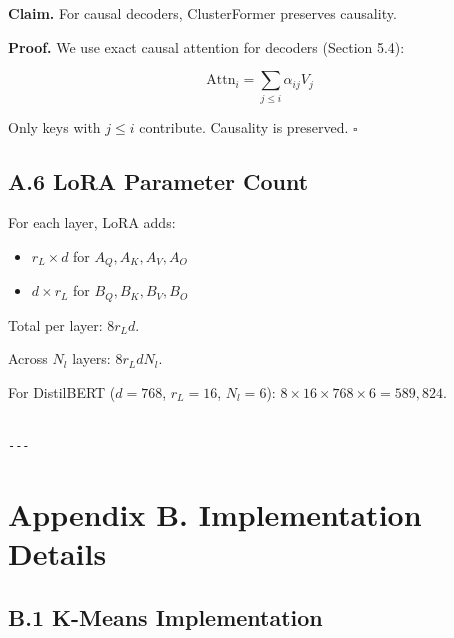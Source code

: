 \textbf{Claim.} For causal decoders, ClusterFormer preserves causality.

\textbf{Proof.} We use exact causal attention for decoders (Section 5.4):

\[
\text{Attn}_i = \sum_{j \leq i} \alpha_{ij} V_j
\]

Only keys with $j \leq i$ contribute. Causality is preserved. $\square$

\subsection{A.6 LoRA Parameter Count}

For each layer, LoRA adds:
\begin{itemize}
\item $r_L \times d$ for $A_Q, A_K, A_V, A_O$
\item $d \times r_L$ for $B_Q, B_K, B_V, B_O$

\end{itemize}
Total per layer: $8 r_L d$.

Across $N_l$ layers: $8 r_L d N_l$.

For DistilBERT ($d=768$, $r_L=16$, $N_l=6$): $8 \times 16 \times 768 \times 6 = 589{,}824$.
\begin{lstlisting}

---
\end{lstlisting}

\section{Appendix B. Implementation Details}

\subsection{B.1 K-Means Implementation}

